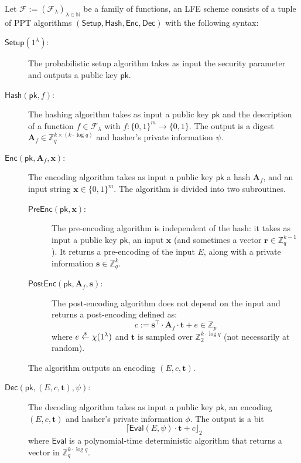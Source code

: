 \documentclass{theoretics}
\newcommand{\getsr}{\overset{\raisebox{-1pt}{$\scriptscriptstyle \$$}}{\gets}}
\newcommand{\sample}{\getsr}
\newcommand{\Pre}{\mathsf{Pre}}
\newcommand{\Post}{\mathsf{Post}}
\newcommand{\N}{\mathbb{N}}
\newcommand{\Z}{\mathbb{Z}}
\renewcommand{\sec}{\ensuremath{\lambda}}
\newcommand{\algofont}[1]{\ensuremath{\mathsf{#1}}}
\newcommand{\Enc}{{\algofont{Enc}}}
\newcommand{\Dec}{{\algofont{Dec}}}
\newcommand{\Setup}{{\algofont{Setup}}}
\newcommand{\Eval}{\algofont{Eval}\xspace}
\newcommand{\Hash}{{\algofont{Hash}}}
\newcommand{\pk}{{\mathsf{pk}}}
\newcommand\bbbone{1}
\begin{document}
\begin{definition}\label{def:LFE}
Let $\mathcal{F}:=(\mathcal{F}_\sec)_{\sec\in\N}$ be a family of functions, an LFE scheme consists of a tuple of PPT algorithms $(\Setup, \Hash, \Enc, \Dec)$ with the following syntax:
\begin{description}
    \item[$\Setup(\bbbone^\sec)$:] The probabilistic setup algorithm takes as input the security parameter and outputs a public key $\pk$.
    \item[$\Hash(\pk, f)$:] The hashing algorithm takes as input a public key $\pk$ and the description of a function $f\in\mathcal{F}_\sec$ with $f: \{0,1\}^{m} \to \{0,1\}$.
    The output is a digest $\mathbf{A}_f\in\Z_q^{k\times (k\cdot \log q)}$ and hasher's private information $\psi$.
    \item[$\Enc(\pk,\mathbf{A}_f, \mathbf{x})$:] The encoding algorithm takes as input a public key $\pk$ a hash $\mathbf{A}_f$, and an input string $\mathbf{x}\in\{0,1\}^m$. The algorithm is divided into two subroutines.
    \begin{description}
    \item[$\Pre\Enc(\pk, \mathbf{x})$:] The pre-encoding algorithm is independent of the hash: it takes as input a public key $\pk$, an input $\mathbf{x}$ (and sometimes a vector $\mathbf{r}\in\Z_q^{k-1}$). It returns a pre-encoding of the input $E$, along with a private information $\mathbf{s}\in\Z_q^{k}$. 
    \item[$\Post\Enc(\pk, \mathbf{A}_f, \mathbf{s})$:] The post-encoding algorithm does not depend on the input and returns a post-encoding defined as:
    \[
    c := \mathbf{s}^\intercal \cdot \mathbf{A}_f\cdot \mathbf{t} + e \in \Z_p
    \]
    where $e \sample \chi(\bbbone^\sec)$ and $\mathbf{t}$ is sampled over $\Z_2^{k\cdot \log q}$ (not necessarily at random).

    \end{description}
    The algorithm outputs an encoding $(E, c, \mathbf{t})$.
    
    \item[$\Dec(\pk, (E, c, \mathbf{t}), \psi)$:] The decoding algorithm takes as input a public key $\pk$, an encoding $(E, c, \mathbf{t})$ and hasher's private information $\phi$. The output is a bit 
    \[
    \lceil\Eval(E, \psi) \cdot \mathbf{t}+c\rfloor_2
    \]
    where $\Eval$ is a polynomial-time deterministic algorithm that returns a vector in $\Z_q^{k\cdot \log q}$.
\end{description}
\end{definition}
\end{document}
